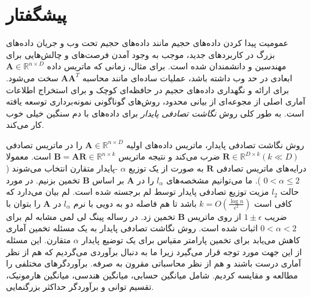 \chapter{پیشگفتار}

عمومیت پیدا کردن داده‌های حجیم مانند داده‌های حجیم تحت وب و جریان‌ داده‌های بزرگ در کاربردهای جدید،
موجب به وجود آمدن فرصت‌های و چالش‌هایی برای مهندسین و دانشمندان شده است.%
\cite{li2007stable}
برای مثال، زمانی که ماتریس داده 
$\mathbf{A} \in \mathbb{R}^{n \times D}$
ابعادی در حد وب داشته باشد، عملیات ساده‌ای مانند محاسبه
$\mathbf{A} \mathbf{A}^T$
سخت می‌شود.
برای ارائه و نگهداری داده‌های حجیم در حافظه‌ای کوچک و برای استخراج اطلاعات آماری اصلی از مجوعه‌ای از بیانی محدود، روش‌های گوناگونی نمونه‌برداری توسعه‌ یافته است. به طور کلی روش 
\textit{نگاشت تصادفی پایدار}%
 برای داده‌های با دم سنگین خیلی خوب کار می‌کند.

روش نگاشت تصادفی پایدار، ماتریس داده‌های اولیه 
$\mathbf{A} \in \mathbb{R}^{n \times D}$
را در ماتریس تصادفی 
$\mathbf{R} \in \mathbb{R}^{D \times k} (k \ll D)$
 ضرب می‌کند و نتیجه ماتریس
$\mathbf{B} = \mathbf{AR} \in \mathbb{R}^{n \times k}$
است. 
معمولا درایه‌های ماتریس تصادفی
$\mathbf{R}$
به صورت 
%
از یک توزیع 
$\alpha$
-پایدار متقارن انتخاب می‌شوند (
$ 0 < \alpha \leq 2$
).
ما می‌توانیم مشخصه‌های 
$l_\alpha$
را در 
$\mathbf{A}$
بر اساس 
$\mathbf{B}$
تخمین بزنیم. در مورد حالت 
$l_2$
مزیت توزیع تصادفی پایدار توسط لم 
%
برجسته شده است. لم 
بیان می‌دارد که کافی است 
$k=O(\frac{ \log  n}{\epsilon^ 2})$
باشد تا هم فاصله دو به دویی با نرم 
$l_\alpha$
در 
$\mathbf{A}$
را بتوان با ضریب 
$1 \pm \epsilon$
از روی ماتریس 
$\mathbf{B}$
تخمین زد. در رساله پینگ لی%
\cite{li2007stable}
لمی مشابه لم 
برای 
$0 < \alpha < 2$
اثبات شده است. روش نگاشت تصادفی پایدار به یک مسئله تخمین آماری کاهش می‌یابد برای تخمین پارامتر مقیاس برای یک توضیع پایدار $\alpha$ متقارن. این مسئله از این جهت مورد توجه قرار می‌گیرد زیرا ما به دنبال برآوردی می‌گردیم که هم از نظر آماری درست باشند و هم از نظر محاسباتی مقرون به صرفه. برآوردگرهای مختلفی را مطالعه و مقایسه کردیم. شامل میانگین حسابی، میانگین هندسی، میانگین هارمونیک، تقسیم توانی%
و برآوردگر حداکثر بزرگنمایی.

